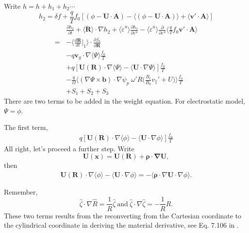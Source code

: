 \documentclass[12pt]{article}
\begin{document}
\begin{CJK*}{UTF8}{gbsn}
Write $h=h + h_1 + h_2 \cdots$
\begin{equation}
    h_2 = \delta f + \frac{q}{T}f_0 [(\phi - \mathbf{U\cdot A}) - \langle(\phi - \mathbf{U\cdot A})\rangle + \langle\mathbf{v'\cdot A}\rangle]
\end{equation}
\begin{equation}
\begin{split}
    \ \ \ \ &\frac{\partial h_2}{\partial t} + \langle\mathbf{\dot{R}}\rangle\cdot\nabla h_2 + \langle\dot{\varepsilon}^u\rangle\frac{\partial h_1}{\partial\varepsilon^u}
    - \langle\dot{\varepsilon}^u\rangle\frac{\partial }{\partial\varepsilon^u}\langle\frac{q}{T}f_0\mathbf{v'\cdot A}\rangle\\
    =&-\bigg\langle\frac{d\mathbf{R}}{dt}\bigg|_1\bigg\rangle\cdot\frac{\partial f_0}{\partial\mathbf{R}}\\
    &-q\mathbf{v}_g\cdot\nabla\langle\Psi\rangle\frac{f_0}{T}\\
    &+q[\mathbf{U(R)}\cdot\nabla\langle\Psi\rangle-\langle\mathbf{U}\cdot\nabla\Psi\rangle]\frac{f_0}{T}\\
    &-\frac{q}{\Omega}\bigg\langle(\nabla\Psi\times\mathbf{b})\cdot\nabla\psi_p\ \omega'R\bigg(\frac{B_t}{B_0}v_\parallel'+U\bigg)\bigg\rangle\frac{f_0}{T}\\
    &+S_1+S_2+S_3
\end{split}
\end{equation}
There are two terms to be added in the weight equation. For electrostatic model, $\Psi=\phi$.

The first term, 
\begin{equation}
\begin{split}
    q[\mathbf{U(R)}\cdot\nabla\langle\phi\rangle-\langle\mathbf{U}\cdot\nabla\phi\rangle]\frac{f_0}{T}
\end{split}
\end{equation}
All right, let's proceed a further step. Write
\begin{equation}
    \mathbf{U(x)=U(R) + \boldsymbol{\rho}\cdot\nabla U},
\end{equation}
then
\begin{equation}
    \begin{split}
        \mathbf{U(R)}\cdot\nabla\langle\phi\rangle-\langle\mathbf{U}\cdot\nabla\phi\rangle=-\langle\boldsymbol{\rho}\cdot\nabla \mathbf{U}\cdot\nabla\phi\rangle.
    \end{split}
\end{equation}
{\color{cyan}Remember,
\begin{equation*}
\hat{\zeta}\cdot\nabla\hat{R}=\frac{1}{R}\hat{\zeta}\ \textrm{and}\ \hat{\zeta}\cdot\nabla\hat{\zeta}=-\frac{1}{R}\hat{R}.   
\end{equation*}
These two terms results from the reconverting from the Cartesian coordinate to the cylindrical coordinate in deriving the material derivative,
see Eq. 7.106 in \cite{vc}.

}
\end{CJK*}
\end{document}
